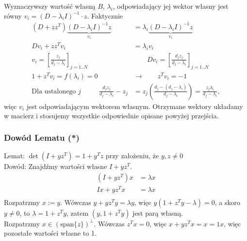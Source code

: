 \documentclass[a4paper,12pt]{article}
\begin{document}
Wyznaczywszy wartość własną $B$, $\lambda_i$, odpowiadający jej wektor własny jest
równy $v_i = (D - \lambda_i I)^{-1}\cdot z$. Faktycznie
\begin{align*}
    (D + zz^T)\underbrace{(D - \lambda_i I)^{-1}z}_{v_i}                  & = \lambda_i \underbrace{(D - \lambda_i I)^{-1} z}_{v_i}                                                    \\
    Dv_i + zz^Tv_i                                                        & = \lambda_i v_i                                                                                            \\
    v_i = \left[\frac{z_j}{d_j - \lambda_i}\right]_{j=1..N}
    \qquad                                                                & \qquad
    Dv_i = \left[\frac{d_j z_j}{d_j - \lambda_i}\right]_{j=1..N}                                                                                                                       \\
    1+z^Tv_i = f(\lambda_i) = 0 \qquad                                    & \to \qquad z^Tv_i = -1                                                                                     \\
    \text{Dla ustalonego $j$ }\qquad\frac{d_j z_j}{d_j - \lambda_i} - z_j & = z_j \left(\frac{d_j - (d_j - \lambda_i)}{d_j - \lambda_i}\right) = \frac{z_j\lambda_i}{d_j - \lambda_i},
\end{align*}
więc $v_i$ jest odpowiadającym wektorem własnym. Otrzymane wektory układamy
w macierz i stosujemy wszystkie odpowiednie opisane powyżej przejścia.

\subsubsection*{Dowód Lematu (*)}
Lemat: $\det(I + yz^T) = 1 + y^T z$ przy założeniu, że $y, z \neq 0$
\\
Dowód: Znajdźmy wartości własne $I + yz^T$.
\begin{align*}
    (I + yz^T)x & = \lambda x \\
    Ix + yz^Tx  & = \lambda x \\
\end{align*}
Rozpatrzmy $x := y$. Wówczas $y + yz^Ty = \lambda y$, więc $y(1 + z^Ty - \lambda) = 0$, a skoro $y \neq 0$,
to $\lambda = 1 + z^Ty$, zatem $(y, 1 + z^Ty)$ jest parą własną.
\\
Rozpatrzmy $x \in (\text{span}\{z\})^{\perp}$. Wówczas $z^Tx = 0$, więc $x + yz^Tx = x = 1 x$, więc pozostałe wartości własne to 1.
\end{document}
